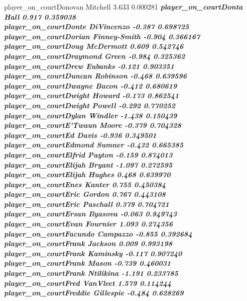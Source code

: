\documentclass[
  landscape]{article}
\begin{document}
player\_on\_courtDonovan Mitchell 3.633 0.000281 \textbf{\emph{
player\_on\_courtDonta Hall 0.917 0.359038\\
player\_on\_courtDonte DiVincenzo -0.387 0.698725\\
player\_on\_courtDorian Finney-Smith -0.904 0.366167\\
player\_on\_courtDoug McDermott 0.609 0.542746\\
player\_on\_courtDraymond Green -0.984 0.325362\\
player\_on\_courtDrew Eubanks -0.121 0.903351\\
player\_on\_courtDuncan Robinson -0.468 0.639596\\
player\_on\_courtDwayne Bacon -0.412 0.680619\\
player\_on\_courtDwight Howard -0.173 0.862541\\
player\_on\_courtDwight Powell -0.292 0.770252\\
player\_on\_courtDylan Windler -1.438 0.150439\\
player\_on\_courtE'Twaun Moore -0.379 0.704328\\
player\_on\_courtEd Davis -0.936 0.349501\\
player\_on\_courtEdmond Sumner -0.432 0.665385\\
player\_on\_courtElfrid Payton -0.159 0.874013\\
player\_on\_courtElijah Bryant -1.097 0.272595\\
player\_on\_courtElijah Hughes 0.468 0.639970\\
player\_on\_courtEnes Kanter 0.755 0.450384\\
player\_on\_courtEric Gordon 0.767 0.443108\\
player\_on\_courtEric Paschall 0.379 0.704721\\
player\_on\_courtErsan Ilyasova -0.063 0.949743\\
player\_on\_courtEvan Fournier 1.093 0.274356\\
player\_on\_courtFacundo Campazzo -0.855 0.392684\\
player\_on\_courtFrank Jackson 0.009 0.993198\\
player\_on\_courtFrank Kaminsky -0.117 0.907240\\
player\_on\_courtFrank Mason -0.739 0.460031\\
player\_on\_courtFrank Ntilikina -1.191 0.233785\\
player\_on\_courtFred VanVleet 1.579 0.114244\\
player\_on\_courtFreddie Gillespie -0.484 0.628269\\
}}
\end{document}

